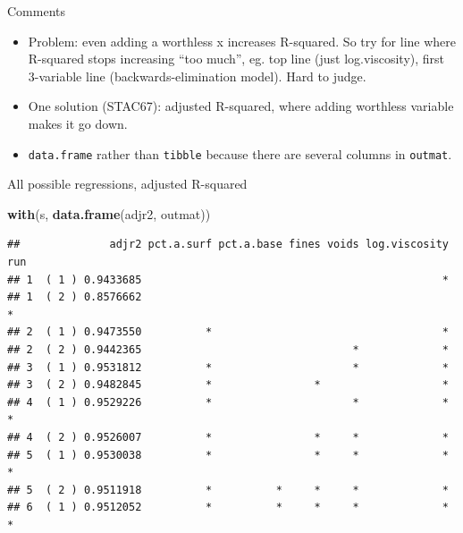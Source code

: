 \documentclass[ignorenonframetext,]{beamer}
\newenvironment{Shaded}{\begin{snugshade}}{\end{snugshade}}
\newcommand{\KeywordTok}[1]{\textcolor[rgb]{0.13,0.29,0.53}{\textbf{#1}}}
\newcommand{\NormalTok}[1]{#1}
\providecommand{\tightlist}{%
  \setlength{\itemsep}{0pt}\setlength{\parskip}{0pt}}
\begin{document}
\begin{frame}[fragile]{Comments}
\protect\hypertarget{comments-22}{}

\begin{itemize}
\tightlist
\item
  Problem: even adding a worthless x increases R-squared. So try for
  line where R-squared stops increasing ``too much'', eg. top line (just
  log.viscosity), first 3-variable line (backwards-elimination model).
  Hard to judge.
\item
  One solution (STAC67): adjusted R-squared, where adding worthless
  variable makes it go down.
\item
  \texttt{data.frame} rather than \texttt{tibble} because there are
  several columns in \texttt{outmat}.
\end{itemize}

\end{frame}

\begin{frame}[fragile]{All possible regressions, adjusted R-squared}
\protect\hypertarget{all-possible-regressions-adjusted-r-squared}{}

\scriptsize

\begin{Shaded}
\begin{Highlighting}[]
\KeywordTok{with}\NormalTok{(s, }\KeywordTok{data.frame}\NormalTok{(adjr2, outmat))}
\end{Highlighting}
\end{Shaded}

\begin{verbatim}
##              adjr2 pct.a.surf pct.a.base fines voids log.viscosity run
## 1  ( 1 ) 0.9433685                                               *    
## 1  ( 2 ) 0.8576662                                                   *
## 2  ( 1 ) 0.9473550          *                                    *    
## 2  ( 2 ) 0.9442365                                 *             *    
## 3  ( 1 ) 0.9531812          *                      *             *    
## 3  ( 2 ) 0.9482845          *                *                   *    
## 4  ( 1 ) 0.9529226          *                      *             *   *
## 4  ( 2 ) 0.9526007          *                *     *             *    
## 5  ( 1 ) 0.9530038          *                *     *             *   *
## 5  ( 2 ) 0.9511918          *          *     *     *             *    
## 6  ( 1 ) 0.9512052          *          *     *     *             *   *
\end{verbatim}

\normalsize

\end{frame}
\end{document}
